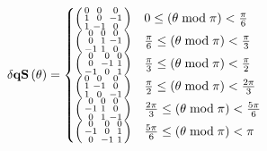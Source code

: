 \begin{equation}\label{eq:perturbationFunctionSigns}
\dqs[\theta] =
\begin{cases}
 \left(
\begin{smallmatrix}
 0 & 0 & 0 \\
 1 & 0 & -1 \\
 1 & -1 & 0 \\
\end{smallmatrix} 
\right) & 0\leq (\theta  \bmod \pi )<\frac{\pi }{6} \\
 \left(
\begin{smallmatrix}
 0 & 0 & 0 \\
 0 & 1 & -1 \\
 -1 & 1 & 0 \\
\end{smallmatrix} 
\right) & \frac{\pi }{6}\leq (\theta  \bmod \pi )<\frac{\pi }{3} \\
 \left(
\begin{smallmatrix}
 0 & 0 & 0 \\
 0 & -1 & 1 \\
 -1 & 0 & 1 \\
\end{smallmatrix} 
\right) & \frac{\pi }{3}\leq (\theta  \bmod \pi )<\frac{\pi }{2} \\
 \left(
\begin{smallmatrix}
 0 & 0 & 0 \\
 1 & -1 & 0 \\
 1 & 0 & -1 \\
\end{smallmatrix} 
\right) & \frac{\pi }{2}\leq (\theta  \bmod \pi )<\frac{2 \pi }{3} \\
 \left(
\begin{smallmatrix}
 0 & 0 & 0 \\
 -1 & 1 & 0 \\
 0 & 1 & -1 \\
\end{smallmatrix} 
\right) & \frac{2 \pi }{3}\leq (\theta  \bmod \pi )<\frac{5 \pi }{6} \\
 \left(
\begin{smallmatrix}
 0 & 0 & 0 \\
 -1 & 0 & 1 \\
 0 & -1 & 1 \\
\end{smallmatrix} 
\right) & \frac{5 \pi }{6}\leq (\theta  \bmod \pi )<\pi 
\end{cases}
\end{equation}

